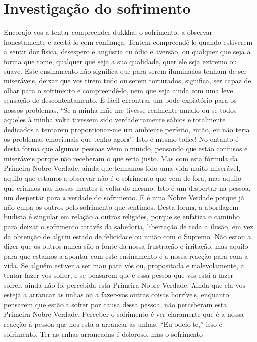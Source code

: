 \section{Investigação do sofrimento}

Encorajo-vos a tentar compreender dukkha, o sofrimento,
a observar honestamente e aceitá-lo com confiança. Tentem
compreendê-lo quando estiverem a sentir dor física, desespero e angústia ou ódio e aversão, ou qualquer que seja a
forma que tome, qualquer que seja a sua qualidade, quer ele
seja extremo ou suave. Este ensinamento não significa que
para serem iluminados tenham de ser miseráveis, deixar que
vos tirem tudo ou serem torturados, significa, ser capaz de
olhar para o sofrimento e compreendê-lo, nem que seja ainda
com uma leve sensação de descontentamento.
É fácil encontrar um bode expiatório para os nossos
problemas. “Se a minha mãe me tivesse realmente amado ou
se todos aqueles à minha volta tivessem sido verdadeiramente
sábios e totalmente dedicados a tentarem proporcionar-me
um ambiente perfeito, então, eu não teria os problemas emocionais que tenho agora”. Isto é mesmo tolice! No entanto é
desta forma que algumas pessoas vêem o mundo, pensando
que estão confusos e miseráveis porque não receberam o que
seria justo. Mas com esta fórmula da Primeira Nobre
Verdade, ainda que tenhamos tido uma vida muito miserável,
aquilo que estamos a observar não é o sofrimento que vem de
fora, mas aquilo que criamos nas nossas mentes à volta do
mesmo. Isto é um despertar na pessoa, um despertar para a
verdade do sofrimento. E é uma Nobre Verdade porque já não
culpa os outros pelo sofrimento que sentimos. Desta forma, a
abordagem budista é singular em relação a outras religiões,
porque se enfatiza o caminho para deixar o sofrimento através
da sabedoria, libertação de toda a ilusão, em vez da obtenção
de algum estado de felicidade ou união com o Supremo.
Não estou a dizer que os outros nunca são a fonte da
nossa frustração e irritação, mas aquilo para que estamos a
apontar com este ensinamento é a nossa reacção para com a
vida. Se alguém estiver a ser mau para vós ou, propositada e
malevolamente, a tentar fazer-vos sofrer, e se pensarem que é
essa pessoa que vos está a fazer sofrer, ainda não foi percebida
esta Primeira Nobre Verdade. Ainda que ela vos esteja a
arrancar as unhas ou a fazer-vos outras coisas horríveis,
enquanto pensarem que estão a sofrer por causa dessa pessoa,
não perceberam esta Primeira Nobre Verdade. Perceber o
sofrimento é ver claramente que é a nossa reacção à pessoa
que nos está a arrancar as unhas, “Eu odeio-te,” isso é sofrimento. Ter as unhas arrancadas é doloroso, mas o sofrimento
